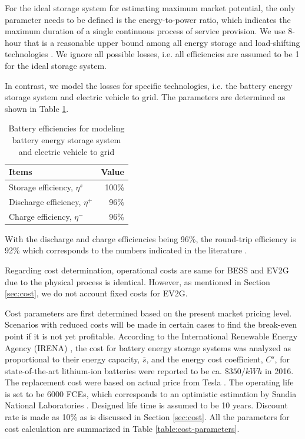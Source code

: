 For the ideal storage system for estimating maximum market potential, the only parameter needs to be defined is the energy-to-power ratio, which indicates the maximum duration of a single continuous process of service provision. We use 8-hour that is a reasonable upper bound among all energy storage and load-shifting technologies \cite{Muller2016}. We ignore all possible losses, i.e. all efficiencies are assumed to be 1 for the ideal storage system.

In contrast, we model the losses for specific technologies, i.e. the battery energy storage system and electric vehicle to grid. The parameters are determined as shown in Table \ref{tab:battery-efficiency}. 

\begin{table}
	\centering
	\begin{tabular}{l r}
		\textbf{Items} & \textbf{Value} \\%
		\hline
		Storage efficiency, $\eta^s$ & 100\% \\
		Discharge efficiency, $\eta^+$ & 96\% \\
		Charge efficiency, $\eta^-$ & 96\% \\
		\hline		
	\end{tabular}
\caption{Battery efficiencies for modeling battery energy storage system and electric vehicle to grid}\label{tab:battery-efficiency}
\end{table}

With the discharge and charge efficiencies being 96\%, the round-trip efficiency is 92\% which corresponds to the numbers indicated in the literature \cite{Akhil2015,Megel2017,IRENA2017}.

Regarding cost determination, operational costs are same for BESS and EV2G due to the physical process is identical. However, as mentioned in Section \ref{sec:cost}, we do not account fixed costs for EV2G.

Cost parameters are first determined based on the present market pricing level. Scenarios with reduced costs will be made in certain cases to find the break-even point if it is not yet profitable. According to the International Renewable Energy Agency (IRENA) \cite{IRENA2017}, the cost for battery energy storage systems was analyzed as proportional to their energy capacity, $\overline{s}$, and the energy cost coefficient, $C^s$, for state-of-the-art lithium-ion batteries were reported to be ca. $\$350/kWh$ in 2016. The replacement cost were based on actual price from Tesla \cite{Tesla1}. The operating life is set to be 6000 FCEs, which corresponds to an optimistic estimation by Sandia National Laboratories \cite{Akhil2015}. Designed life time is assumed to be 10 years. Discount rate is made as 10\% as is discussed in Section \ref{sec:cost}. All the parameters for cost calculation are summarized in Table \ref{table:cost-parameters}. 

